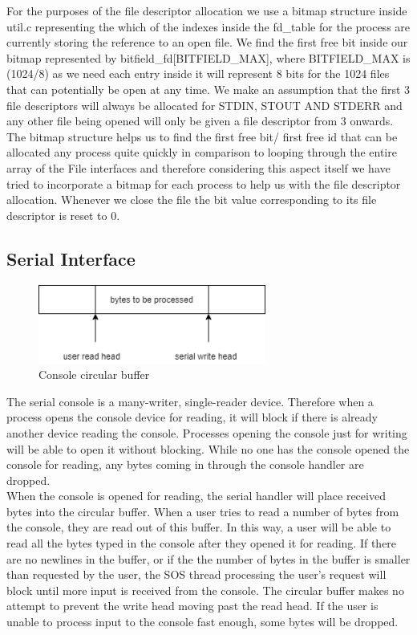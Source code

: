 \noindent
For the purposes of the file descriptor allocation we use a bitmap structure inside util.c representing the which of the indexes inside the fd\_table for the process are currently storing the reference to an open file.
We find the first free bit inside our bitmap represented by bitfield\_fd[BITFIELD\_MAX], where BITFIELD\_MAX is (1024/8) as we need each entry inside it will represent 8 bits for the 1024 files that can potentially be open at any time.
We make an assumption that the first 3 file descriptors will always be allocated for STDIN, STOUT AND STDERR and any other file being opened will only be given a file descriptor from 3 onwards.
The bitmap structure helps us to find the first free bit/ first free id that can be allocated any process quite quickly in comparison to looping through the entire array of the 
File interfaces and therefore considering this aspect itself we have tried to incorporate a bitmap for each process to help us with the file descriptor allocation.
Whenever we close the file the bit value corresponding to its file descriptor is reset to 0.
\\

\subsection{Serial Interface}

\begin{figure}[h]
    \centering
    \includegraphics[width=75mm]{serial_buffer.png}
    \caption{Console circular buffer}
    \label{fig:serial_buffer}
\end{figure}

\noindent
The serial console is a many-writer, single-reader device. Therefore
when a process opens the console device for reading, it will block if there
is already another device reading the console. Processes opening the console
just for writing will be able to open it without blocking. While no one has
the console opened the console for reading, any bytes coming in through the 
console handler are dropped.
\\

\noindent
When the console is opened for reading, the serial handler will place received
bytes into the circular buffer. When a user tries to read a number of bytes
from the console, they are read out of this buffer. In this way, a user will
be able to read all the bytes typed in the console after they opened it for
reading. If there are no newlines in the buffer, or if the the number of bytes
in the buffer is smaller than requested by the user, the SOS thread processing
the user's request will block until more input is received from the console.
The circular buffer makes no attempt to prevent the write head moving past
the read head. If the user is unable to process input to the console fast
enough, some bytes will be dropped.
\\



